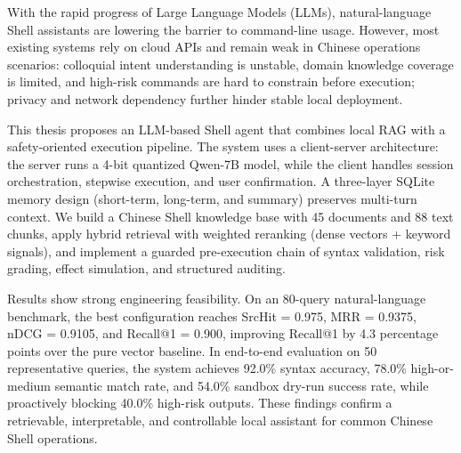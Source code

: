 ﻿\begin{englishabstract}

With the rapid progress of Large Language Models (LLMs), natural-language Shell assistants are lowering the barrier to command-line usage. However, most existing systems rely on cloud APIs and remain weak in Chinese operations scenarios: colloquial intent understanding is unstable, domain knowledge coverage is limited, and high-risk commands are hard to constrain before execution; privacy and network dependency further hinder stable local deployment.

This thesis proposes an LLM-based Shell agent that combines local RAG with a safety-oriented execution pipeline. The system uses a client-server architecture: the server runs a 4-bit quantized Qwen-7B model, while the client handles session orchestration, stepwise execution, and user confirmation. A three-layer SQLite memory design (short-term, long-term, and summary) preserves multi-turn context. We build a Chinese Shell knowledge base with 45 documents and 88 text chunks, apply hybrid retrieval with weighted reranking (dense vectors + keyword signals), and implement a guarded pre-execution chain of syntax validation, risk grading, effect simulation, and structured auditing.

Results show strong engineering feasibility. On an 80-query natural-language benchmark, the best configuration reaches SrcHit = 0.975, MRR = 0.9375, nDCG = 0.9105, and Recall@1 = 0.900, improving Recall@1 by 4.3 percentage points over the pure vector baseline. In end-to-end evaluation on 50 representative queries, the system achieves 92.0\% syntax accuracy, 78.0\% high-or-medium semantic match rate, and 54.0\% sandbox dry-run success rate, while proactively blocking 40.0\% high-risk outputs. These findings confirm a retrievable, interpretable, and controllable local assistant for common Chinese Shell operations.

\end{englishabstract}

